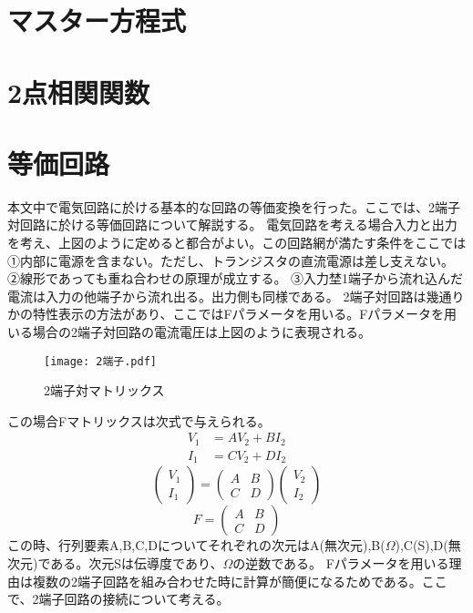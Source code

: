\section{マスター方程式}
\section{2点相関関数}
\section{等価回路}
本文中で電気回路に於ける基本的な回路の等価変換を行った。ここでは、2端子対回路に於ける等価回路について解説する。\cite*{電気回路,続電気回路の基礎}
電気回路を考える場合入力と出力を考え、上図のように定めると都合がよい。この回路網が満たす条件をここでは
①内部に電源を含まない。ただし、トランジスタの直流電源は差し支えない。
②線形であっても重ね合わせの原理が成立する。
③入力埜1端子から流れ込んだ電流は入力の他端子から流れ出る。出力側も同様である。
2端子対回路は幾通りかの特性表示の方法があり、ここではFパラメータを用いる。Fパラメータを用いる場合の2端子対回路の電流電圧は上図のように表現される。
\begin{figure}[H]
    \centering
    \texttt{[image: 2端子.pdf]}
    \caption{2端子対マトリックス}
\end{figure}
この場合Fマトリックスは次式で与えられる。
\begin{eqnarray}
    V_1 &= AV_2 + BI_2\\
    I_1 &= CV_2 +DI_2 
\end{eqnarray}
\begin{equation*}
    \begin{pmatrix}V_1\\I_1\end{pmatrix} = \begin{pmatrix}A&B\\C&D\end{pmatrix}\begin{pmatrix}V_2\\I_2\end{pmatrix}
\end{equation*}
\begin{equation*}
    F = \begin{pmatrix}A&B\\C&D\end{pmatrix}
\end{equation*}
この時、行列要素A,B,C,Dについてそれぞれの次元はA(無次元),B($\Omega$),C(S),D(無次元)である。次元Sは伝導度であり、$\Omega$の逆数である。
Fパラメータを用いる理由は複数の2端子回路を組み合わせた時に計算が簡便になるためである。ここで、2端子回路の接続について考える。
